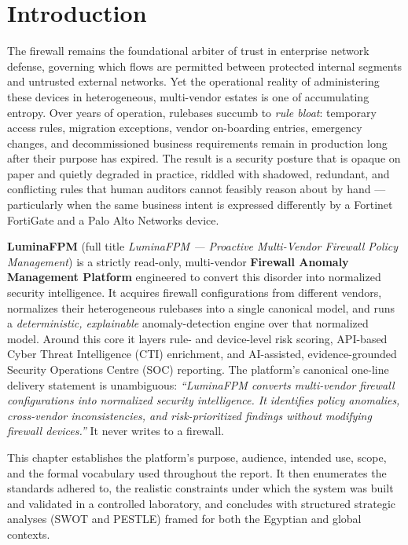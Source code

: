 \chapter{Introduction}
\label{ch:introduction}

The firewall remains the foundational arbiter of trust in enterprise network defense, governing which flows are permitted between protected internal segments and untrusted external networks. Yet the operational reality of administering these devices in heterogeneous, multi-vendor estates is one of accumulating entropy. Over years of operation, rulebases succumb to \emph{rule bloat}: temporary access rules, migration exceptions, vendor on-boarding entries, emergency changes, and decommissioned business requirements remain in production long after their purpose has expired. The result is a security posture that is opaque on paper and quietly degraded in practice, riddled with shadowed, redundant, and conflicting rules that human auditors cannot feasibly reason about by hand --- particularly when the same business intent is expressed differently by a Fortinet FortiGate and a Palo Alto Networks device.

\textbf{LuminaFPM} (full title \emph{LuminaFPM --- Proactive Multi-Vendor Firewall Policy Management}) is a strictly read-only, multi-vendor \textbf{Firewall Anomaly Management Platform} engineered to convert this disorder into normalized security intelligence. It acquires firewall configurations from different vendors, normalizes their heterogeneous rulebases into a single canonical model, and runs a \emph{deterministic, explainable} anomaly-detection engine over that normalized model. Around this core it layers rule- and device-level risk scoring, API-based Cyber Threat Intelligence (CTI) enrichment, and AI-assisted, evidence-grounded Security Operations Centre (SOC) reporting. The platform's canonical one-line delivery statement is unambiguous: \emph{``LuminaFPM converts multi-vendor firewall configurations into normalized security intelligence. It identifies policy anomalies, cross-vendor inconsistencies, and risk-prioritized findings without modifying firewall devices.''} It never writes to a firewall.

This chapter establishes the platform's purpose, audience, intended use, scope, and the formal vocabulary used throughout the report. It then enumerates the standards adhered to, the realistic constraints under which the system was built and validated in a controlled laboratory, and concludes with structured strategic analyses (SWOT and PESTLE) framed for both the Egyptian and global contexts.

